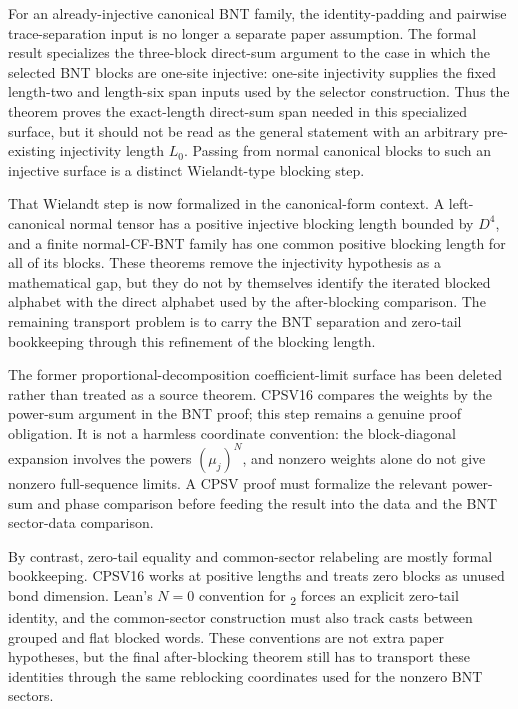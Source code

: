 \documentclass{article}
\begin{document}
For an already-injective canonical BNT family, the identity-padding and pairwise
trace-separation input is no longer a separate paper assumption. The formal
result specializes the three-block direct-sum argument to the case in which the
selected BNT blocks are one-site injective: one-site injectivity supplies the
fixed length-two and length-six span inputs used by the selector construction.
Thus the theorem proves the exact-length direct-sum span needed in this
specialized surface, but it should not be read as the general statement with an
arbitrary pre-existing injectivity length $L_0$. Passing from normal
canonical blocks to such an injective surface is a distinct Wielandt-type
blocking step.

That Wielandt step is now formalized in the canonical-form context. A
left-canonical normal tensor has a positive injective blocking length bounded by
$D^4$, and a finite normal-CF-BNT family has one common positive blocking
length for all of its blocks. These theorems remove the injectivity hypothesis
as a mathematical gap, but they do not by themselves identify the iterated
blocked alphabet with the direct alphabet used by the after-blocking comparison.
The remaining transport problem is to carry the BNT separation and zero-tail
bookkeeping through this refinement of the blocking length.

The former proportional-decomposition coefficient-limit surface has been
deleted rather than treated as a source theorem. CPSV16 compares the weights by
the power-sum argument in the BNT proof; this step remains a genuine proof
obligation. It is not a harmless coordinate convention: the block-diagonal
expansion involves the powers $(\mu_j)^N$, and nonzero weights alone do not
give nonzero full-sequence limits. A CPSV proof must formalize the
relevant power-sum and phase comparison before feeding the result into the
 data and the BNT sector-data
comparison.

By contrast, zero-tail equality and common-sector relabeling are mostly formal
bookkeeping. CPSV16 works at positive lengths and treats zero blocks as unused
bond dimension. Lean's $N=0$ convention for \textsubscript{2} forces an
explicit zero-tail identity, and the common-sector construction must also track
casts between grouped and flat blocked words. These conventions are not extra
paper hypotheses, but the final after-blocking theorem still has to transport
these identities through the same reblocking coordinates used for the nonzero
BNT sectors.
\end{document}
